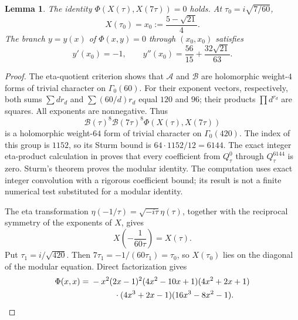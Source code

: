 \documentclass[11pt,a4paper]{article}
\newtheorem{lemma}[theorem]{Lemma}
\theoremstyle{remark}
\newcommand{\code}[1]{\path{#1}}
\begin{document}
\begin{lemma}\label{lem:CM}
The identity $\Phi(X(\tau),X(7\tau))=0$ holds. At
$\tau_0=i\sqrt{7/60}$,
\begin{equation}\label{eq:CM}
 X(\tau_0)=x_0:=\frac{5-\sqrt{21}}4.
\end{equation}
The branch $y=y(x)$ of $\Phi(x,y)=0$ through $(x_0,x_0)$ satisfies
\begin{equation}\label{eq:ysecond}
 y'(x_0)=-1,\qquad y''(x_0)=\frac{56}{15}+\frac{32\sqrt{21}}{63}.
\end{equation}
\end{lemma}
\begin{proof}
The eta-quotient criterion shows that $\mathcal A$ and $\mathcal B$
are holomorphic weight-$4$ forms of trivial character on $\Gamma_0(60)$.
For their exponent vectors, respectively, both sums
$\sum d r_d$ and $\sum (60/d)r_d$ equal $120$ and $96$; their products
$\prod d^{r_d}$ are squares. All exponents are nonnegative.
Thus
\[
 \mathcal B(\tau)^8\mathcal B(7\tau)^8
                \Phi(X(\tau),X(7\tau))
\]
is a holomorphic weight-$64$ form of trivial character on
$\Gamma_0(420)$. The index of this group is $1152$, so its Sturm
bound is $64\cdot1152/12=6144$. The exact integer eta-product
calculation in \code{prize90_geometry_mod7_sturm.py} proves that
every coefficient from $Q_\tau^0$ through $Q_\tau^{6144}$ is zero.
Sturm's theorem \cite{Sturm} proves the modular identity.
The computation uses exact integer convolution with a rigorous
coefficient bound; its result is not a finite numerical test substituted
for a modular identity.

The eta transformation $\eta(-1/\tau)=\sqrt{-i\tau}\eta(\tau)$,
together with the reciprocal symmetry of the exponents of $X$, gives
\begin{equation}\label{eq:FrickeX}
 X\left(-\frac1{60\tau}\right)=X(\tau).
\end{equation}
Put $\tau_1=i/\sqrt{420}$. Then
$7\tau_1=-1/(60\tau_1)=\tau_0$, so $X(\tau_0)$ lies on the diagonal
of the modular equation. Direct factorization gives
\begin{align}\label{eq:diagonal}
\Phi(x,x)={}&-x^2(2x-1)^2(4x^2-10x+1)(4x^2+2x+1)\notag\\
 &\hspace{10mm}\cdot(4x^3+2x-1)(16x^3-8x^2-1).
\end{align}


\end{proof}
\end{document}
